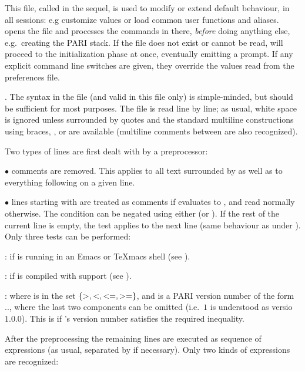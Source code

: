 This file, called  in the sequel, is used to modify or extend
default behaviour, in all  sessions: e.g customize  values or
load common user functions and aliases.  opens the  file and
processes the commands in there, \emph{before} doing anything else,
e.g.~creating the PARI stack. If the file does not exist or cannot be read,
 will proceed to the initialization phase at once, eventually emitting a
prompt. If any explicit command line switches are given, they override the
values read from the preferences file.

. The syntax in the  file (and valid in this file
only) is simple-minded, but should be sufficient for most purposes. The file
is read line by line; as usual, white space is ignored unless surrounded by
quotes and the standard multiline constructions using braces, \kbd{\bs}, or
\kbd{=} are available (multiline comments between \kbd{/*~\dots~*/} are also
recognized).

Two types of lines are first dealt with by a preprocessor:

$\bullet$ comments are removed. This applies to all text surrounded by
\kbd{/*~\dots~*/} as well as to everything following \kbd{\bs\bs} on a given
line.

$\bullet$ lines starting with   are treated as
comments if  evaluates to , and read normally
otherwise. The condition can be negated using either  (or
). If the rest of the current line is empty, the test applies to
the next line (same behaviour as \kbd{=} under ). Only three tests can be
performed:

:  if  is running in an Emacs or TeXmacs shell (see
).

:  if  is compiled with  support (see
).

  : where  is in the set
$\{ {\tt >}, {\tt <}, {\tt <=}, {\tt >=} \}$, and  is a PARI
version number of the form .., where the
last two components can be omitted (i.e.~$1$ is understood as versio $1.0.0$).
This is  if 's version number satisfies the required
inequality.

After the preprocessing the remaining lines are executed as
sequence of expressions (as usual, separated by \kbd{;} if necessary). Only
two kinds of expressions are recognized:

